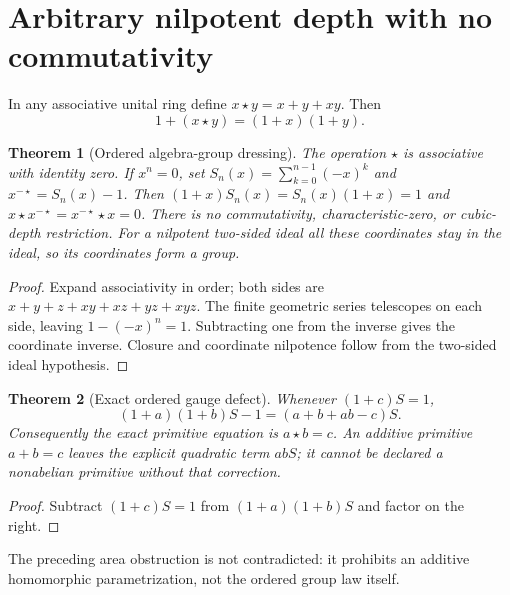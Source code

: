\documentclass[11pt]{article}
\newtheorem{theorem}{Theorem}
\begin{document}
\section{Arbitrary nilpotent depth with no commutativity}
In any associative unital ring define
$x\star y=x+y+xy$. Then
\[
 1+(x\star y)=(1+x)(1+y).
\]
\begin{theorem}[Ordered algebra-group dressing]
The operation $\star$ is associative with identity zero. If $x^n=0$, set
$S_n(x)=\sum_{k=0}^{n-1}(-x)^k$ and $x^{-\star}=S_n(x)-1$.
Then $(1+x)S_n(x)=S_n(x)(1+x)=1$ and
$x\star x^{-\star}=x^{-\star}\star x=0$.
There is no commutativity, characteristic-zero, or cubic-depth restriction.
For a nilpotent two-sided ideal all these coordinates stay in the ideal,
so its coordinates form a group.
\end{theorem}
\begin{proof}
Expand associativity in order; both sides are
$x+y+z+xy+xz+yz+xyz$.
The finite geometric series telescopes on each side, leaving
$1-(-x)^n=1$. Subtracting one from the inverse gives the coordinate inverse.
Closure and coordinate nilpotence follow from the two-sided ideal hypothesis.
\end{proof}
\begin{theorem}[Exact ordered gauge defect]
Whenever $(1+c)S=1$,
\[
 (1+a)(1+b)S-1=(a+b+ab-c)S.
\]
Consequently the exact primitive equation is $a\star b=c$.
An additive primitive $a+b=c$ leaves the explicit quadratic term $abS$;
it cannot be declared a nonabelian primitive without that correction.
\end{theorem}
\begin{proof}
Subtract $(1+c)S=1$ from $(1+a)(1+b)S$ and factor on the right.
\end{proof}
The preceding area obstruction is not contradicted: it prohibits an
additive homomorphic parametrization, not the ordered group law itself.
\end{document}
